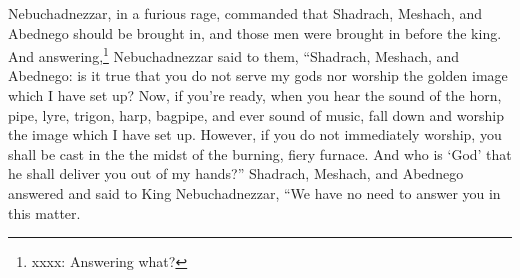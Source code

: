 \begin{inparaenum}
     Nebuchadnezzar, in a furious rage, commanded that Shadrach, Meshach, and Abednego should be brought in, and those men were brought in before the king.%
     And answering,\footnote{xxxx: Answering what?} Nebuchadnezzar said to them, ``Shadrach, Meshach, and Abednego: is it true that you do not serve my gods nor worship the golden image which I have set up?%
     Now, if you're ready, when you hear the sound of the horn, pipe, lyre, trigon, harp, bagpipe, and ever sound of music, fall down and worship the image which I have set up. However, if you do not immediately worship, you shall be cast in the the midst of the burning, fiery furnace. And who is `God' that he shall deliver you out of my hands?''%
     Shadrach, Meshach, and Abednego answered and said to King Nebuchadnezzar, ``We have no need to answer you in this matter.%
    
    
    
    
\end{inparaenum}
